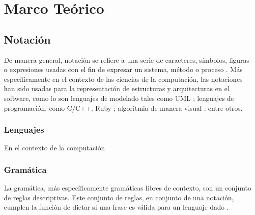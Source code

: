 \section{Marco Teórico}


\subsection{Notación}

De manera general, notación se refiere a una serie de caracteres, símbolos, figuras o expresiones usadas con el fin de expresar un sistema, método o proceso \cite{MerriamWebsterNotation}. Más específicamente en el contexto de las ciencias de la computación, las notaciones han sido usadas para la representación de estructuras y arquitecturas en el software, como lo son lenguajes de modelado tales como UML \cite{WhatIsUML}; lenguajes de programación, como C/C++, Ruby \cite{Bansal2013}; algoritmia de manera visual \cite{RutanenKalle2018McoO}; entre otros.



\subsubsection{Lenguajes}

En el contexto de la computación

\subsubsection{Gramática}


La gramática, más específicamente gramáticas libres de contexto, son un conjunto de reglas descriptivas. Este conjunto de reglas, en conjunto de una notación, cumplen la función de dictar si una frase es válida para un lenguaje dado \cite[p. 101]{Sipser2012-wl}. 


